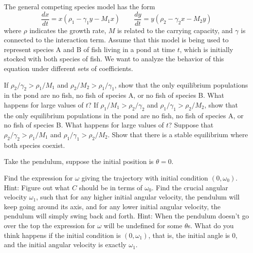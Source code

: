 \documentclass{ximera}
\begin{document}
\begin{exercise}
    The general competing species model has the form
    \[ 
        \frac{dx}{dt} = x(\rho_1 - \gamma_1 y - M_1 x) \qquad \frac{dy}{dt} = y(\rho_2 - \gamma_2 x - M_2 y) 
    \] 
    where $\rho$ indicates the growth rate, $M$ is related to the carrying capacity, and $\gamma$ is connected to the interaction term. Assume that this model is being used to represent species A and B of fish living in a pond at time $t$, which is initially stocked with both species of fish. We want to analyze the behavior of this equation under different sets of coefficients.
    \begin{tasks}
        \task If $\rho_2/\gamma_2 > \rho_1/M_1$ and $\rho_2/M_2 > \rho_1/\gamma_1$, show that the only equilibrium populations in the pond are no fish, no fish of species A, or no fish of species B. What happens for large values of $t$?
        \task If $ \rho_1/M_1 > \rho_2/\gamma_2 $ and $\rho_1/\gamma_1 > \rho_2/M_2$, show that the only equilibrium populations in the pond are no fish, no fish of species A, or no fish of species B. What happens for large values of $t$?
        \task Suppose that $\rho_2/\gamma_2 > \rho_1/M_1$ and $\rho_1/\gamma_1 > \rho_2/M_2$. Show that there is a stable equilibrium where both species coexist. 
    \end{tasks}
\end{exercise}

\begin{exercise}%
    Take the pendulum, suppose the initial position is $\theta = 0$.
    \begin{tasks}
        \task Find the expression for $\omega$ giving the trajectory with initial condition $(0,\omega_0)$.  Hint: Figure out what $C$ should be in terms of $\omega_0$.
        \task Find the crucial angular velocity $\omega_1$, such that for any higher initial angular velocity, the pendulum will keep going around its axis, and for any lower initial angular velocity, the pendulum will simply swing back and forth. Hint: When the pendulum doesn't go over the top the expression for $\omega$ will be undefined for some $\theta$s.
        \task What do you think happens if the initial condition is $(0,\omega_1)$, that is, the initial angle is 0, and the initial angular velocity is exactly $\omega_1$.
    \end{tasks}
\end{exercise}
\end{document}

